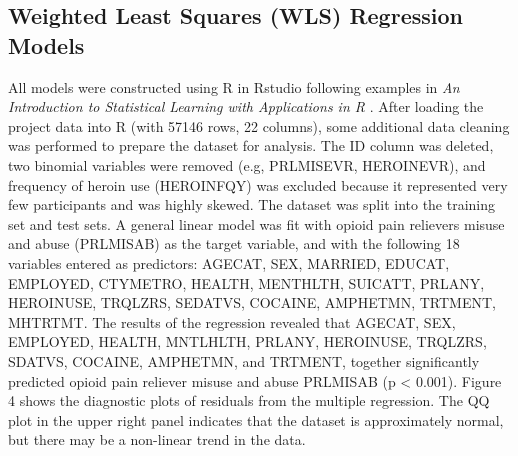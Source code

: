 \documentclass[sigconf]{acmart}
\begin{document}




\subsection{Weighted Least Squares (WLS) Regression Models}

All models were constructed using R in Rstudio following examples in 
\emph{An Introduction to Statistical Learning with Applications in R} 
\cite{statlearn13}. After loading the project data into R (with 57146 rows, 
22 columns), some additional data cleaning was performed to prepare the 
dataset for analysis. The ID column was deleted, two binomial variables were 
removed (e.g, PRLMISEVR, HEROINEVR), and frequency of heroin use (HEROINFQY) 
was excluded because it represented very few participants and was highly skewed. 
The dataset was split into the training set and test sets. A general linear 
model was fit with opioid pain relievers misuse and abuse (PRLMISAB) as the 
target variable, and with the following 18 variables entered as predictors: 
AGECAT, SEX, MARRIED, EDUCAT, EMPLOYED, CTYMETRO, HEALTH, MENTHLTH, SUICATT,
PRLANY, HEROINUSE, TRQLZRS, SEDATVS, COCAINE, AMPHETMN, TRTMENT, MHTRTMT. 
The results of the regression revealed that AGECAT, SEX, EMPLOYED, HEALTH, 
MNTLHLTH, PRLANY, HEROINUSE, TRQLZRS, SDATVS, COCAINE, AMPHETMN, and TRTMENT, 
together significantly predicted opioid pain reliever misuse and abuse 
PRLMISAB (p < 0.001). Figure 4 shows the diagnostic plots of residuals from 
the multiple regression. The QQ plot in the upper right panel indicates that 
the dataset is approximately normal, but there may be a non-linear trend 
in the data. 


\end{document}
